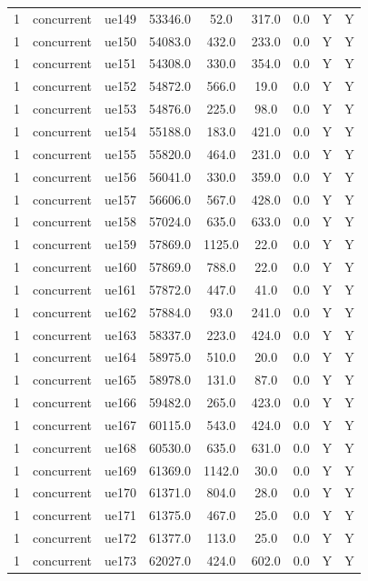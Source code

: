 \begin{table}[ht]
\begin{tabular}{|c|c|c|c|c|c|c|c|c|}
1 & concurrent & ue149 & 53346.0 & 52.0 & 317.0 & 0.0 & Y & Y \\
1 & concurrent & ue150 & 54083.0 & 432.0 & 233.0 & 0.0 & Y & Y \\
1 & concurrent & ue151 & 54308.0 & 330.0 & 354.0 & 0.0 & Y & Y \\
1 & concurrent & ue152 & 54872.0 & 566.0 & 19.0 & 0.0 & Y & Y \\
1 & concurrent & ue153 & 54876.0 & 225.0 & 98.0 & 0.0 & Y & Y \\
1 & concurrent & ue154 & 55188.0 & 183.0 & 421.0 & 0.0 & Y & Y \\
1 & concurrent & ue155 & 55820.0 & 464.0 & 231.0 & 0.0 & Y & Y \\
1 & concurrent & ue156 & 56041.0 & 330.0 & 359.0 & 0.0 & Y & Y \\
1 & concurrent & ue157 & 56606.0 & 567.0 & 428.0 & 0.0 & Y & Y \\
1 & concurrent & ue158 & 57024.0 & 635.0 & 633.0 & 0.0 & Y & Y \\
1 & concurrent & ue159 & 57869.0 & 1125.0 & 22.0 & 0.0 & Y & Y \\
1 & concurrent & ue160 & 57869.0 & 788.0 & 22.0 & 0.0 & Y & Y \\
1 & concurrent & ue161 & 57872.0 & 447.0 & 41.0 & 0.0 & Y & Y \\
1 & concurrent & ue162 & 57884.0 & 93.0 & 241.0 & 0.0 & Y & Y \\
1 & concurrent & ue163 & 58337.0 & 223.0 & 424.0 & 0.0 & Y & Y \\
1 & concurrent & ue164 & 58975.0 & 510.0 & 20.0 & 0.0 & Y & Y \\
1 & concurrent & ue165 & 58978.0 & 131.0 & 87.0 & 0.0 & Y & Y \\
1 & concurrent & ue166 & 59482.0 & 265.0 & 423.0 & 0.0 & Y & Y \\
1 & concurrent & ue167 & 60115.0 & 543.0 & 424.0 & 0.0 & Y & Y \\
1 & concurrent & ue168 & 60530.0 & 635.0 & 631.0 & 0.0 & Y & Y \\
1 & concurrent & ue169 & 61369.0 & 1142.0 & 30.0 & 0.0 & Y & Y \\
1 & concurrent & ue170 & 61371.0 & 804.0 & 28.0 & 0.0 & Y & Y \\
1 & concurrent & ue171 & 61375.0 & 467.0 & 25.0 & 0.0 & Y & Y \\
1 & concurrent & ue172 & 61377.0 & 113.0 & 25.0 & 0.0 & Y & Y \\
1 & concurrent & ue173 & 62027.0 & 424.0 & 602.0 & 0.0 & Y & Y \\

\end{tabular}
\end{table}
